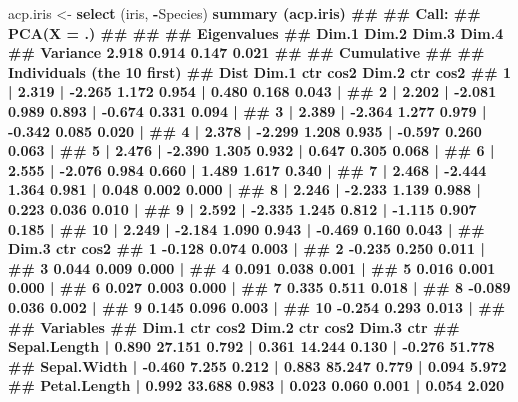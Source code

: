\documentclass[]{book}
\newenvironment{Shaded}{\begin{snugshade}}{\end{snugshade}}
\newcommand{\KeywordTok}[1]{\textcolor[rgb]{0.13,0.29,0.53}{\textbf{#1}}}
\newcommand{\NormalTok}[1]{#1}
\newcommand{\OperatorTok}[1]{\textcolor[rgb]{0.81,0.36,0.00}{\textbf{#1}}}
\newcommand{\StringTok}[1]{\textcolor[rgb]{0.31,0.60,0.02}{#1}}
\begin{document}
\begin{Shaded}
\begin{Highlighting}[]
\NormalTok{acp.iris <-}\StringTok{ }\KeywordTok{select}\NormalTok{ (iris, }\OperatorTok{-}\NormalTok{Species) }\OperatorTok{%
\KeywordTok{summary}\NormalTok{ (acp.iris)}
\NormalTok{## }
\NormalTok{## Call:}
\NormalTok{## PCA(X = .) }
\NormalTok{## }
\NormalTok{## }
\NormalTok{## Eigenvalues}
\NormalTok{##                        Dim.1   Dim.2   Dim.3   Dim.4}
\NormalTok{## Variance               2.918   0.914   0.147   0.021}
\NormalTok{## %
\NormalTok{## Cumulative %
\NormalTok{## }
\NormalTok{## Individuals (the 10 first)}
\NormalTok{##                  Dist    Dim.1    ctr   cos2    Dim.2    ctr   cos2  }
\NormalTok{## 1            |  2.319 | -2.265  1.172  0.954 |  0.480  0.168  0.043 |}
\NormalTok{## 2            |  2.202 | -2.081  0.989  0.893 | -0.674  0.331  0.094 |}
\NormalTok{## 3            |  2.389 | -2.364  1.277  0.979 | -0.342  0.085  0.020 |}
\NormalTok{## 4            |  2.378 | -2.299  1.208  0.935 | -0.597  0.260  0.063 |}
\NormalTok{## 5            |  2.476 | -2.390  1.305  0.932 |  0.647  0.305  0.068 |}
\NormalTok{## 6            |  2.555 | -2.076  0.984  0.660 |  1.489  1.617  0.340 |}
\NormalTok{## 7            |  2.468 | -2.444  1.364  0.981 |  0.048  0.002  0.000 |}
\NormalTok{## 8            |  2.246 | -2.233  1.139  0.988 |  0.223  0.036  0.010 |}
\NormalTok{## 9            |  2.592 | -2.335  1.245  0.812 | -1.115  0.907  0.185 |}
\NormalTok{## 10           |  2.249 | -2.184  1.090  0.943 | -0.469  0.160  0.043 |}
\NormalTok{##               Dim.3    ctr   cos2  }
\NormalTok{## 1            -0.128  0.074  0.003 |}
\NormalTok{## 2            -0.235  0.250  0.011 |}
\NormalTok{## 3             0.044  0.009  0.000 |}
\NormalTok{## 4             0.091  0.038  0.001 |}
\NormalTok{## 5             0.016  0.001  0.000 |}
\NormalTok{## 6             0.027  0.003  0.000 |}
\NormalTok{## 7             0.335  0.511  0.018 |}
\NormalTok{## 8            -0.089  0.036  0.002 |}
\NormalTok{## 9             0.145  0.096  0.003 |}
\NormalTok{## 10           -0.254  0.293  0.013 |}
\NormalTok{## }
\NormalTok{## Variables}
\NormalTok{##                 Dim.1    ctr   cos2    Dim.2    ctr   cos2    Dim.3    ctr}
\NormalTok{## Sepal.Length |  0.890 27.151  0.792 |  0.361 14.244  0.130 | -0.276 51.778}
\NormalTok{## Sepal.Width  | -0.460  7.255  0.212 |  0.883 85.247  0.779 |  0.094  5.972}
\NormalTok{## Petal.Length |  0.992 33.688  0.983 |  0.023  0.060  0.001 |  0.054  2.020}
}}}
\end{Highlighting}
\end{Shaded}
\end{document}

